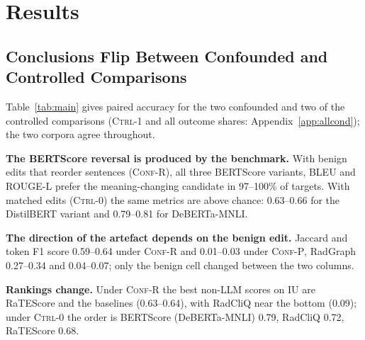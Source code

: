 \documentclass[11pt]{article}
\newcommand{\ctrlz}{\textsc{Ctrl-0}\xspace}
\newcommand{\ctrlo}{\textsc{Ctrl-1}\xspace}
\newcommand{\ctrlt}{\textsc{Ctrl-2}\xspace}
\newcommand{\confr}{\textsc{Conf-R}\xspace}
\newcommand{\confp}{\textsc{Conf-P}\xspace}
\newcommand{\tbd}[1]{\textcolor{red}{[TBD: #1]}}
\begin{document}
\section{Results}

\begin{table}[t]
\centering
\footnotesize
\renewcommand{\arraystretch}{0.93}
\setlength{\tabcolsep}{5pt}
\begin{adjustbox}{max width=\textwidth}

\end{adjustbox}
\caption{Paired accuracy (chance 0.5). \textsc{R}: \confr (C0 vs.\ P1). \textsc{P}: \confp (C0 vs.\ P2). \textsc{0}: \ctrlz (C0 vs.\ P0). \textsc{2}: \ctrlt (C2 vs.\ P2). \emph{tie}: share of \ctrlz targets on which P0 and C0 receive exactly the same score. \emph{strict}: \ctrlz on the strict-matched subset (443 / 486 targets), where Jaccard and token F1 are 0.50 by construction. In column \textsc{0}, $^{\downarrow}$ marks a paired accuracy significantly below that of Jaccard, $^{\circ}$ one not distinguishable from it, and unmarked values are significantly above it; $^{\ast}$ marks a significant drop from \ctrlz to \ctrlt (bootstrap over reports, 95\%). Proprietary judges: \tbd{rows}.}
\label{tab:main}
\end{table}

\subsection{Conclusions Flip Between Confounded and Controlled Comparisons}

Table~\ref{tab:main} gives paired accuracy for the two confounded and two of the controlled comparisons (\ctrlo and all outcome shares: Appendix~\ref{app:allcond}); the two corpora agree throughout.

\textbf{The BERTScore reversal is produced by the benchmark.} With benign edits that reorder sentences (\confr), all three BERTScore variants, BLEU and ROUGE-L prefer the meaning-changing candidate in 97--100\% of targets. With matched edits (\ctrlz) the same metrics are above chance: 0.63--0.66 for the DistilBERT variant and 0.79--0.81 for DeBERTa-MNLI.

\textbf{The direction of the artefact depends on the benign edit.} Jaccard and token F1 score 0.59--0.64 under \confr and 0.01--0.03 under \confp, RadGraph 0.27--0.34 and 0.04--0.07; only the benign cell changed between the two columns.

\textbf{Rankings change.} Under \confr the best non-LLM scores on IU are RaTEScore and the baselines (0.63--0.64), with RadCliQ near the bottom (0.09); under \ctrlz the order is BERTScore (DeBERTa-MNLI) 0.79, RadCliQ 0.72, RaTEScore 0.68.
\end{document}
